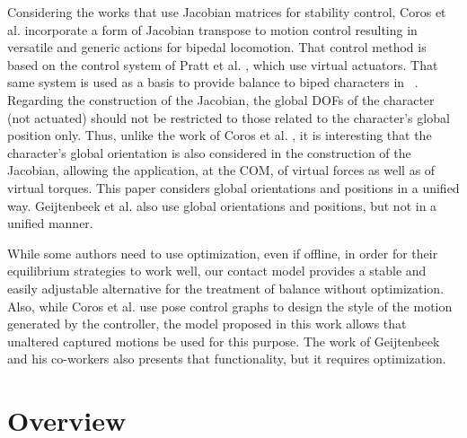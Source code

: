 \documentclass[tog]{acmsiggraph}
\begin{document}
Considering the works that use Jacobian matrices for stability control, Coros et al.  incorporate a form of
Jacobian transpose \cite{bib:Sunada94} to motion control resulting in versatile and generic actions for bipedal locomotion. That control method
is based on the control system of Pratt et al. , which use virtual actuators. That same system is used as a basis to provide
balance to biped characters in ~\cite{bib:Geijtenbeek12,bib:Zordan02}. Regarding the construction of the Jacobian, the global DOFs of the
character (not actuated) should not be restricted to those related to the character’s global position only.  Thus, unlike the work of Coros et al.
, it is interesting that the character’s global orientation is also considered in the construction
of the Jacobian, allowing the application, at the COM, of virtual forces as well as of virtual torques. This paper considers global orientations
and positions in a unified way. Geijtenbeek et al.  also use global orientations and positions, but not in a unified manner.

While some authors \cite{bib:Abe07,bib:Macchietto09,bib:Wang09,bib:Geijtenbeek12} need to use optimization, even if offline, 
in order for their equilibrium strategies to work well, our contact model provides a stable and easily adjustable alternative for the treatment
of balance without optimization. Also, while Coros et al.  use pose control graphs \cite{bib:Yin07} to 
design the style of the motion generated by the controller, the model proposed in this work allows that unaltered captured motions be used for
this purpose. The work of Geijtenbeek and his co-workers \cite{bib:Geijtenbeek12} also presents that functionality, but it requires optimization.


\section{Overview}
\end{document}
